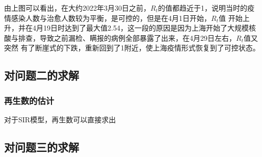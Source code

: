 \documentclass[bwprint]{gmcmthesis}
\numberwithin{figure}{section}
\begin{document}
\par 由上图可以看出，在大约2022年3月30日之前，$R_t$的值都趋近于1，说明当时的疫情感染人数与治愈人数较为平衡，是可控的，但是在4月1日开始，$R_t$值
开始上升，并在4月19日时达到了最大值2.54，这一段的原因是因为上海开始了大规模核酸与排查，导致之前漏检、瞒报的病例全部暴露了出来，在4月29日左右，$R_t$值又突然
有了断崖式的下跌，重新回到了1附近，使上海疫情形式恢复到了可控状态。


\subsection{对问题二的求解}
\subsubsection{再生数的估计}
对于SIR模型，再生数可以直接求出
\subsection{对问题三的求解}
\end{document}
